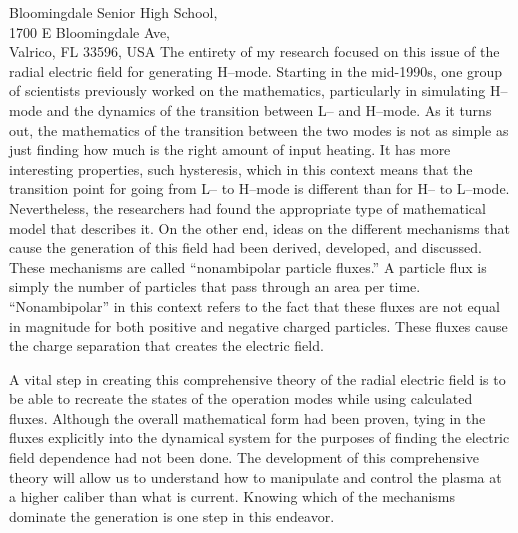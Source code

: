 \documentclass[12pt,a4paper]{letter}
\begin{document}
\begin{letter}{
	Bloomingdale Senior High School,\\
	1700 E Bloomingdale Ave,\\
	Valrico, FL 33596, USA
}
The entirety of my research focused on this issue of the radial electric field for generating H--mode.
Starting in the mid-1990s, one group of scientists previously worked on the mathematics, particularly in simulating H--mode and the dynamics of the transition between L-- and H--mode.
As it turns out, the mathematics of the transition between the two modes is not as simple as just finding how much is the right amount of input heating.
It has more interesting properties, such hysteresis, which in this context means that the transition point for going from L-- to H--mode is different than for H-- to L--mode.
Nevertheless, the researchers had found the appropriate type of mathematical model that describes it.
On the other end, ideas on the different mechanisms that cause the generation of this field had been derived, developed, and discussed.
These mechanisms are called ``nonambipolar particle fluxes.''
A particle flux is simply the number of particles that pass through an area per time.
``Nonambipolar'' in this context refers to the fact that these fluxes are not equal in magnitude for both positive and negative charged particles.
These fluxes cause the charge separation that creates the electric field.

A vital step in creating this comprehensive theory of the radial electric field is to be able to recreate the states of the operation modes while using calculated fluxes.
Although the overall mathematical form had been proven, tying in the fluxes explicitly into the dynamical system for the purposes of finding the electric field dependence had not been done.
The development of this comprehensive theory will allow us to understand how to manipulate and control the plasma at a higher caliber than what is current.
Knowing which of the mechanisms dominate the generation is one step in this endeavor.


\end{letter}
\end{document}
